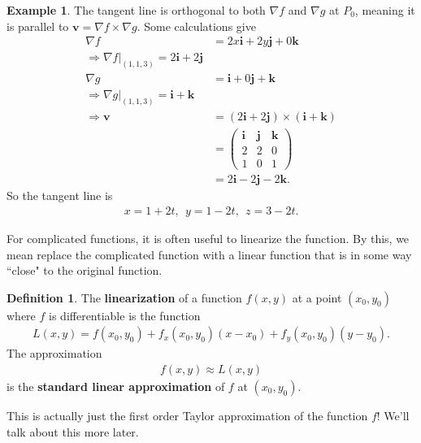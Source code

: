 \documentclass[12pt, letter]{article}
\theoremstyle{plain}
\numberwithin{theorem}{section}
\theoremstyle{definition}
\newtheorem{definition}[theorem]{Definition}
\newtheorem{example}[theorem]{Example}
\begin{document}
\begin{example}
The tangent line is orthogonal to both $\nabla f$ and $\nabla g$ at $P_0$, meaning it is parallel to $\bm{v} = \nabla f \times \nabla g$. Some calculations give
\begin{align*}
\nabla f &= 2x\bm{i}+2y\bm{j}+0\bm{k}\\
\Rightarrow \nabla f \rvert_{(1,1,3)} = 2\bm{i} + 2\bm{j}\\
\nabla g &= \bm{i}+0\bm{j}+\bm{k}\\
\Rightarrow \nabla g \rvert_{(1,1,3)} = \bm{i} + \bm{k}\\
\Rightarrow \bm{v} &= (2\bm{i}+2\bm{j}) \times (\bm{i}+\bm{k})\\
&= \begin{pmatrix} \bm{i} & \bm{j} & \bm{k} \\ 2 & 2 & 0 \\ 1 & 0 & 1 \end{pmatrix}\\
&= 2\bm{i}-2\bm{j}-2\bm{k}.
\end{align*}
So the tangent line is 
\begin{align*}
x=1+2t, \ \ y=1-2t, \ \ z=3-2t.
\end{align*}
\end{example}

\bigskip

\hrulefill

\bigskip

For complicated functions, it is often useful to linearize the function. By this, we mean replace the complicated function with a linear function that is in some way ``close" to the original function.

\bigskip

\begin{definition}
The \textbf{linearization} of a function $f(x,y)$ at a point $(x_0,y_0)$ where $f$ is differentiable is the function
\begin{align*}
L(x,y) = f(x_0,y_0) + f_x(x_0,y_0)(x-x_0) + f_y(x_0,y_0)(y-y_0).
\end{align*}
The approximation
\begin{align*}
f(x,y) \approx L(x,y)
\end{align*}
is the \textbf{standard linear approximation} of $f$ at $(x_0,y_0)$.
\end{definition}

\bigskip

This is actually just the first order Taylor approximation of the function $f$! We'll talk about this more later.
\end{document}

